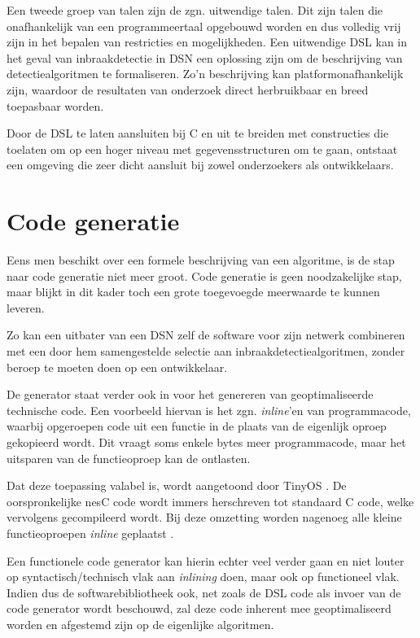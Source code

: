 Een tweede groep van talen zijn de zgn. uitwendige talen. Dit zijn talen die
onafhankelijk van een programmeertaal opgebouwd worden en dus volledig vrij
zijn in het bepalen van restricties en mogelijkheden. Een uitwendige DSL kan in
het geval van inbraakdetectie in DSN een oplossing zijn om de beschrijving van
detectiealgoritmen te formaliseren. Zo'n beschrijving kan platformonafhankelijk
zijn, waardoor de resultaten van onderzoek direct herbruikbaar en breed
toepasbaar worden.

Door de DSL te laten aansluiten bij C en uit te breiden met constructies die
toelaten om op een hoger niveau met gegevensstructuren om te gaan, ontstaat een
omgeving die zeer dicht aansluit bij zowel onderzoekers als ontwikkelaars.

\vspace{-3mm}

\section{Code generatie}
\label{section:solution-codegen}

Eens men beschikt over een formele beschrijving van een algoritme, is de stap
naar code generatie niet meer groot. Code generatie is geen noodzakelijke stap,
maar blijkt in dit kader toch een grote toegevoegde meerwaarde te kunnen
leveren.

Zo kan een uitbater van een DSN zelf de software voor zijn netwerk combineren
met een door hem samengestelde selectie aan inbraakdetectiealgoritmen, zonder
beroep te moeten doen op een ontwikkelaar.

De generator staat verder ook in voor het genereren van geoptimaliseerde
technische code. Een voorbeeld hiervan is het zgn. \emph{inline}'en van
programmacode, waarbij opgeroepen code uit een functie in de plaats van de
eigenlijk oproep gekopieerd wordt. Dit vraagt soms enkele bytes meer
programmacode, maar het uitsparen van de functieoproep kan de \mcu ontlasten.

Dat deze toepassing valabel is, wordt aangetoond door TinyOS
\citep{levis2005tinyos}. De oorspronkelijke nesC code wordt immers herschreven
tot standaard C code, welke vervolgens gecompileerd wordt. Bij deze omzetting
worden nagenoeg alle kleine functieoproepen \emph{inline} geplaatst
\citep{gay2007software}.

Een functionele code generator kan hierin echter veel verder gaan en niet
louter op syntactisch/technisch vlak aan \emph{inlining} doen, maar ook op
functioneel vlak. Indien dus de softwarebibliotheek ook, net zoals de DSL code
als invoer van de code generator wordt beschouwd, zal deze code inherent mee
geoptimaliseerd worden en afgestemd zijn op de eigenlijke algoritmen.

